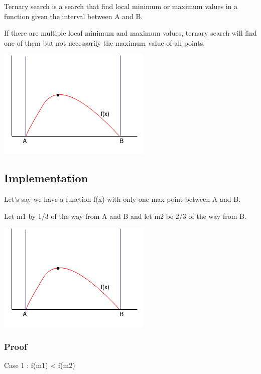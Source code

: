 \documentclass[11pt,oneside]{book}
\makeatletter
\def\maxwidth#1{\ifdim\Gin@nat@width>#1 #1\else\Gin@nat@width\fi}
\makeatother
\begin{document}
Ternary search is a search that find local minimum or maximum values in a function given the interval between A and B.

If there are multiple local minimum and maximum values, ternary search will find one of them but not necessarily the maximum value of all points.

\includegraphics[width=\maxwidth{\textwidth}]{ternarysearch.png}

\subsection{Implementation}

Let's say we have a function f(x) with only one max point between A and B.

Let m1 by 1/3 of the way from A and B and let m2 be 2/3 of the way from B.

\includegraphics[width=\maxwidth{\textwidth}]{ternarysearch.png}

\subsubsection{Proof}

Case 1 : f(m1) < f(m2)
\end{document}
